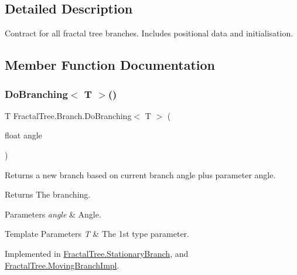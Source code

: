 \subsection{Detailed Description}
Contract for all fractal tree branches. Includes positional data and initialisation. 



\subsection{Member Function Documentation}
\hypertarget{interface_fractal_tree_1_1_branch_ad3240d5e5d13df2ee22e55892f9c03cd}{}\label{interface_fractal_tree_1_1_branch_ad3240d5e5d13df2ee22e55892f9c03cd} 
\subsubsection{\texorpdfstring{Do\+Branching$<$ T $>$()}{DoBranching< T >()}}
{\footnotesize\ttfamily T Fractal\+Tree.\+Branch.\+Do\+Branching$<$ T $>$ (\begin{DoxyParamCaption}\item[{float}]{angle }\end{DoxyParamCaption})}



Returns a new branch based on current branch angle plus parameter angle. 

\begin{DoxyReturn}{Returns}
The branching.
\end{DoxyReturn}

\begin{DoxyParams}{Parameters}
{\em angle} & Angle.\\
\hline
\end{DoxyParams}

\begin{DoxyTemplParams}{Template Parameters}
{\em T} & The 1st type parameter.\\
\hline
\end{DoxyTemplParams}


Implemented in \hyperlink{class_fractal_tree_1_1_stationary_branch_a57ff42d0c4793c0c40aa1671905bf222}{Fractal\+Tree.\+Stationary\+Branch}, and \hyperlink{class_fractal_tree_1_1_moving_branch_impl_a7f7776446fa70aac8efb669f9e41a4af}{Fractal\+Tree.\+Moving\+Branch\+Impl}.

